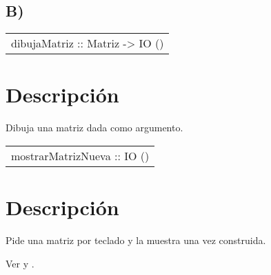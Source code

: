 \subsection{B)}
\begin{haddockdesc}
\item[\begin{tabular}{@{}l}
dibujaMatriz :: Matriz -> IO ()
\end{tabular}]
{\haddockbegindoc
\section*{Descripción}
Dibuja una matriz dada como argumento.\par}
\end{haddockdesc}
\begin{haddockdesc}
\item[\begin{tabular}{@{}l}
mostrarMatrizNueva :: IO ()
\end{tabular}]
{\haddockbegindoc
\section*{Descripción}
Pide una matriz por teclado y la muestra una vez construida.\par
Ver  y .\par}
\end{haddockdesc}
